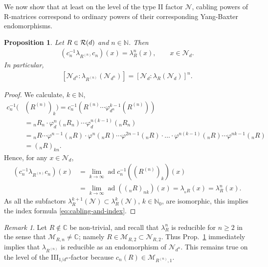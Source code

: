 \documentclass[12pt,a4paper]{amsart}
\numberwithin{equation}{section}
\newtheorem{proposition}[theorem]{Proposition}
\theoremstyle{remark}
\newtheorem{remark}[theorem]{Remark}
\DeclareMathOperator{\ad}{ad}
\newcommand{\Cl}{\mathbb{C}}
\newcommand{\Nl}{\mathbb{N}}
\newcommand{\la}{\lambda}
\newcommand{\CM}[0]{\mathcal{M}} \newcommand{\CN}[0]{\mathcal{N}}
\begin{document}
We now show that at least on the level of the type II factor $\CN$, cabling powers of R-matrices correspond to ordinary powers of their corresponding Yang-Baxter endomorphisms.

\begin{proposition}\label{prop:cabling-and-powers}
	Let $R\in\mathcal{R}(d)$ and $n\in\Nl$. Then
	\begin{align}\label{eq:cabling-and-powers}
		(c_n^{-1}\la_{R^{(n)}}c_n)(x)=\la_R^n(x),\qquad x\in\CN_d.
	\end{align}
	In particular,
	\begin{align}\label{eq:cabling-and-index}
	[\CN_{d^n}:\la_{R^{(n)}}(\CN_{d^{n}})]
	=
	[\CN_d:\la_R(\CN_d)]^n.
	\end{align}
\end{proposition}
\begin{proof}
	We calculate, $k\in\Nl$,
	\begin{align*}
		c_n^{-1}(&(R^{(n)})_k)
		=
		c_n^{-1}(R^{(n)}\cdots\varphi_{d^n}^{k-1}(R^{(n)}))
		\\
		&=
		{}_nR_n\cdot\varphi_d^n({}_nR_n)\cdots\varphi_d^{n(k-1)}({}_nR_n)\\
		&=
		{}_nR\cdots\varphi^{n-1}({}_nR)\cdot\varphi^n({}_nR)\cdots\varphi^{2n-1}({}_nR)\cdot\ldots\cdot
		\varphi^{n(k-1)}({}_nR)\cdots\varphi^{nk-1}({}_nR)
		\\
		&=
		({}_nR)_{kn}.
	\end{align*}
	Hence, for any $x\in\CN_d$,
	\begin{align*}
	 (c_n^{-1}\la_{R^{(n)}}c_n)(x)
	 &=
	 \lim_{k\to\infty}\ad c_n^{-1}((R^{(n)})_k)(x)
	 \\
	 &=
	\lim_{k\to\infty}\ad (({}_nR)_{nk})(x)=\la_{{}_nR}(x)=\la_R^n(x).
	\end{align*}
	As all the subfactors $\la_R^{k+1}(\CN)\subset\la_R^k(\CN)$, $k\in\Nl_0$, are isomorphic, this implies the index formula \eqref{eq:cabling-and-index}.
\end{proof}

\begin{remark}
	Let $R\not\in\Cl$ be non-trivial, and recall that $\la_R^n$ is reducible for $n\geq2$ in the sense that $\CM_{R,n}\neq\Cl$; namely $R\in\CM_{R,2}\subset\CN_{R,2}$. Thus Prop.~\ref{prop:cabling-and-powers} immediately implies that $\la_{R^{(n)}}$ is reducible as an endomorphism of $\CN_{d^n}$. This remains true on the level of the III$_{1/d^n}$-factor because $c_n(R)\in\CM_{R^{(n)},1}$.
\end{remark}
\end{document}
